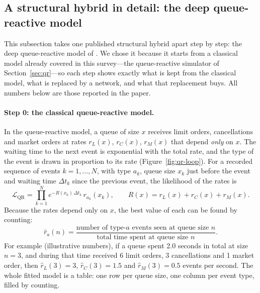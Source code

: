 \subsection{A structural hybrid in detail: the deep queue-reactive model}
\label{sec:hybrid-dqr}

This subsection takes one published structural hybrid apart step by step: the deep queue-reactive model of
\citet{deepqr}. We chose it because it starts
from a classical model already covered in this survey---the queue-reactive simulator of
Section~\ref{sec:qr}---so each step shows exactly what is kept from the classical model, what is replaced by a
network, and what that replacement buys. All numbers below are those reported in the paper.

\paragraph{Step 0: the classical queue-reactive model.} In the queue-reactive model, a queue of size
$x$ receives limit orders, cancellations and market orders at rates $r_L(x)$, $r_C(x)$, $r_M(x)$ that depend
\emph{only} on $x$. The waiting time to the next event is exponential with the total rate, and the type of the
event is drawn in proportion to its rate (Figure~\ref{fig:qr-loop}). For a recorded sequence of events
$k=1,\dots,N$, with type $a_k$, queue size $x_k$ just before the event and waiting time $\Delta t_k$ since the
previous event, the likelihood of the rates is
\begin{equation}
\mathcal{L}_{\text{QR}} = \prod_{k=1}^{N} e^{-R(x_k)\,\Delta t_k}\, r_{a_k}(x_k),
\qquad R(x) = r_L(x) + r_C(x) + r_M(x).
\label{eq:qr-lik}
\end{equation}
Because the rates depend only on $x$, the best value of each can be found by counting:
\begin{equation}
\hat r_a(n) = \frac{\text{number of type-}a\text{ events seen at queue size } n}
                   {\text{total time spent at queue size } n}.
\label{eq:qr-count}
\end{equation}
For example (illustrative numbers), if a queue spent 2.0 seconds in total at size $n=3$, and during that time
received 6 limit orders, 3 cancellations and 1 market order, then $\hat r_L(3)=3$, $\hat r_C(3)=1.5$ and
$\hat r_M(3)=0.5$ events per second. The whole fitted model is a table: one row per queue size, one column per
event type, filled by counting.

